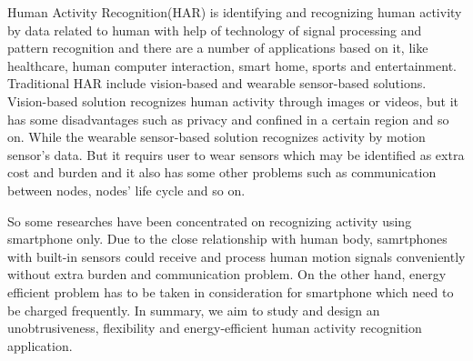 \begin{enabstract}
\par  Human Activity Recognition(HAR) is identifying and recognizing human activity by data related to human with help of technology of signal processing and pattern recognition and there are a number of applications based on it, like healthcare,
human computer interaction, smart home, sports and entertainment. Traditional HAR include vision-based and wearable sensor-based solutions. Vision-based solution recognizes human activity through images or videos, but it has some disadvantages such as privacy and confined in a certain region and so on. While the wearable sensor-based solution recognizes activity by motion sensor's data. But it requirs user to wear sensors which may be identified as extra cost and burden and it also has some other problems such as communication between nodes, nodes' life cycle and so on.
\par So some researches have been concentrated on recognizing activity using smartphone only. Due to the close relationship with human body, samrtphones with built-in sensors could receive and process human motion signals conveniently without extra burden and communication problem. On the other hand, energy efficient problem has to be taken in consideration for smartphone which need to be charged frequently. In summary, we aim to study and design an unobtrusiveness, flexibility and energy-efficient human activity recognition application.
\begin{enumerate}
	

\end{enumerate}
\end{enabstract}
